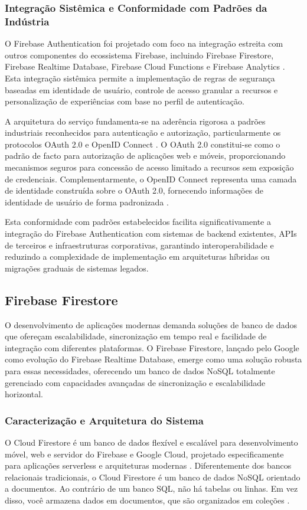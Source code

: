 \subsubsection{Integração Sistêmica e Conformidade com Padrões da Indústria}

O Firebase Authentication foi projetado com foco na integração estreita com outros componentes do ecossistema Firebase, incluindo Firebase Firestore, Firebase Realtime Database, Firebase Cloud Functions e Firebase Analytics \cite{firebase2023ecosystem}. Esta integração sistêmica permite a implementação de regras de segurança baseadas em identidade de usuário, controle de acesso granular a recursos e personalização de experiências com base no perfil de autenticação.

A arquitetura do serviço fundamenta-se na aderência rigorosa a padrões industriais reconhecidos para autenticação e autorização, particularmente os protocolos OAuth 2.0 e OpenID Connect \cite{auth0oauth}. O OAuth 2.0 constitui-se como o padrão de facto para autorização de aplicações web e móveis, proporcionando mecanismos seguros para concessão de acesso limitado a recursos sem exposição de credenciais. Complementarmente, o OpenID Connect representa uma camada de identidade construída sobre o OAuth 2.0, fornecendo informações de identidade de usuário de forma padronizada \cite{openidconnect}.

Esta conformidade com padrões estabelecidos facilita significativamente a integração do Firebase Authentication com sistemas de backend existentes, APIs de terceiros e infraestruturas corporativas, garantindo interoperabilidade e reduzindo a complexidade de implementação em arquiteturas híbridas ou migrações graduais de sistemas legados.


\subsection{Firebase Firestore}

O desenvolvimento de aplicações modernas demanda soluções de banco de dados que ofereçam escalabilidade, sincronização em tempo real e facilidade de integração com diferentes plataformas. O Firebase Firestore, lançado pelo Google como evolução do Firebase Realtime Database, emerge como uma solução robusta para essas necessidades, oferecendo um banco de dados NoSQL totalmente gerenciado com capacidades avançadas de sincronização e escalabilidade horizontal.

\subsubsection{Caracterização e Arquitetura do Sistema}
O Cloud Firestore é um banco de dados flexível e escalável para desenvolvimento móvel, web e servidor do Firebase e Google Cloud, projetado especificamente para aplicações serverless e arquiteturas modernas \cite{firebase_choose_database}. Diferentemente dos bancos relacionais tradicionais, o Cloud Firestore é um banco de dados NoSQL orientado a documentos. Ao contrário de um banco SQL, não há tabelas ou linhas. Em vez disso, você armazena dados em documentos, que são organizados em coleções \cite{firebase_data_model}.


